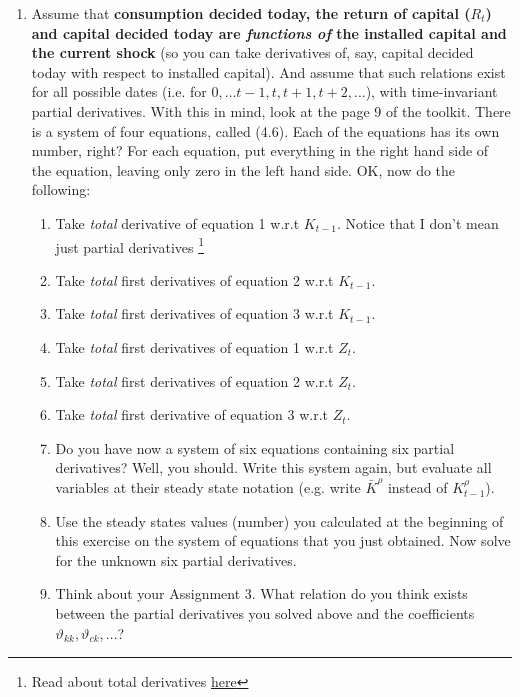 \documentclass[11pt]{article}
\begin{document}
\begin{enumerate}
\item Assume that \textbf{consumption decided today, the return of capital ($R_t$) and capital decided today are \emph{functions of} the installed capital and the current shock} (so you can take derivatives of, say, capital decided today with respect to installed capital). And assume that such relations exist for all possible dates (i.e. for $0, \ldots t-1,t,t+1,t+2,\ldots$), with time-invariant partial derivatives. With this in mind, look at the page 9 of the toolkit. There is a system of four  equations, called (4.6). Each of the equations has its own number, right? For each equation, put everything in the right hand side of the equation, leaving only zero in the left hand side. OK, now do the following:
  \begin{enumerate}
  \item Take \emph{total} derivative of equation 1 w.r.t $K_{t-1}$. Notice that I don't mean just partial derivatives \footnote{Read about total derivatives \href{http://en.wikipedia.org/wiki/Total_derivative}{here}}
  \item Take \emph{total} first derivatives of equation 2 w.r.t $K_{t-1}$.
  \item Take \emph{total} first derivatives of equation 3 w.r.t $K_{t-1}$.
  \item Take \emph{total} first derivatives of equation 1 w.r.t $Z_{t}$.
  \item Take \emph{total} first derivatives of equation 2 w.r.t $Z_{t}$.
  \item Take \emph{total} first derivative of equation 3 w.r.t $Z_{t}$. 
  \item Do you have now a system of six equations containing six partial derivatives? Well, you should. Write this system again, but evaluate all variables at their steady state notation (e.g. write $\bar{K}^{\rho}$ instead of $K^{\rho}_{t-1}$).
  \item Use the steady states values (number) you calculated at the beginning of this exercise on the system of equations that you just obtained. Now solve for the unknown six partial derivatives.
  \item Think about your Assignment 3. What relation do you think exists between the partial derivatives you solved above and the coefficients $\vartheta_{kk},\vartheta_{ck},\ldots$?
  \end{enumerate}
\end{enumerate}
\end{document}
